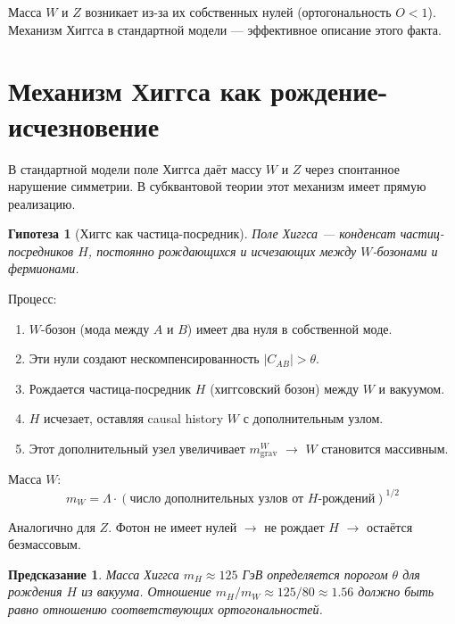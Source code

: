 \documentclass[11pt,a4paper]{article}
\newtheorem{hypothesis}{Гипотеза}[section]
\newtheorem{prediction}{Предсказание}[section]
\theoremstyle{definition}
\begin{document}
Масса $W$ и $Z$ возникает из-за их собственных нулей (ортогональность $O < 1$). Механизм Хиггса в стандартной модели — эффективное описание этого факта.

\section{Механизм Хиггса как рождение-исчезновение}

В стандартной модели поле Хиггса даёт массу $W$ и $Z$ через спонтанное нарушение симметрии. В субквантовой теории этот механизм имеет прямую реализацию.

\begin{hypothesis}[Хиггс как частица-посредник]
Поле Хиггса — конденсат частиц-посредников $H$, постоянно рождающихся и исчезающих между $W$-бозонами и фермионами.
\end{hypothesis}

Процесс:
\begin{enumerate}
    \item $W$-бозон (мода между $A$ и $B$) имеет два нуля в собственной моде.
    \item Эти нули создают нескомпенсированность $|C_{AB}| > \theta$.
    \item Рождается частица-посредник $H$ (хиггсовский бозон) между $W$ и вакуумом.
    \item $H$ исчезает, оставляя causal history $W$ с дополнительным узлом.
    \item Этот дополнительный узел увеличивает $m_{\text{grav}}^W$ $\to$ $W$ становится массивным.
\end{enumerate}

Масса $W$:
\begin{equation}
    m_W = \Lambda \cdot (\text{число дополнительных узлов от } H\text{-рождений})^{1/2}
\end{equation}

Аналогично для $Z$. Фотон не имеет нулей $\to$ не рождает $H$ $\to$ остаётся безмассовым.

\begin{prediction}
Масса Хиггса $m_H \approx 125$ ГэВ определяется порогом $\theta$ для рождения $H$ из вакуума. Отношение $m_H / m_W \approx 125/80 \approx 1.56$ должно быть равно отношению соответствующих ортогональностей.
\end{prediction}

\end{document}
